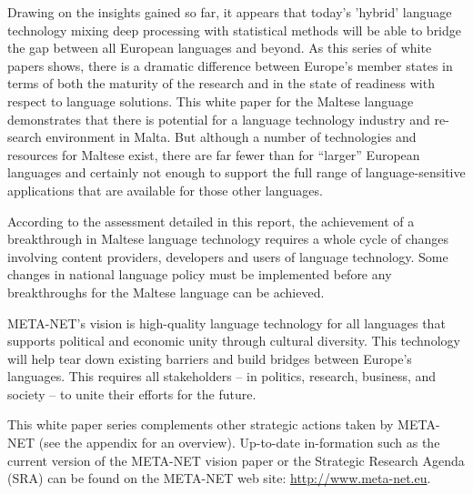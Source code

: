 \begin{multicols}{2}

Drawing on the insights gained so far, it appears that today’s 'hybrid' language technology mixing deep processing with statistical methods will be able to bridge the gap between all European languages and beyond. As this series of white papers shows, there is a dramatic difference between Europe’s member states in terms of both the maturity of the research and in the state of readiness with respect to language solutions. This white paper for the Maltese language demonstrates that there is potential for a language technology industry and re-search environment in Malta. But although a number of technologies and resources for Maltese exist, there are far fewer than for “larger” European languages and certainly not enough to support the full range of language-sensitive applications that are available for those other languages.

According to the assessment detailed in this report, the achievement of a breakthrough in Maltese language technology requires a whole cycle of changes involving content providers, developers and users of language technology. Some changes in national language policy must be implemented before any breakthroughs for the Maltese language can be achieved.

META-NET’s vision is high-quality language technology for all languages that supports political and economic unity through cultural diversity. This technology will help tear down existing barriers and build bridges between Europe’s languages. This requires all stakeholders -- in politics, research, business, and society -- to unite their efforts for the future.

This white paper series complements other strategic actions taken by META-NET (see the appendix for an overview). Up-to-date in-formation such as the current version of the META-NET vision paper \cite{Meta1}  or the Strategic Research Agenda (SRA) can be found on the META-NET web site: \url{http://www.meta-net.eu}.

\end{multicols}

\clearpage



